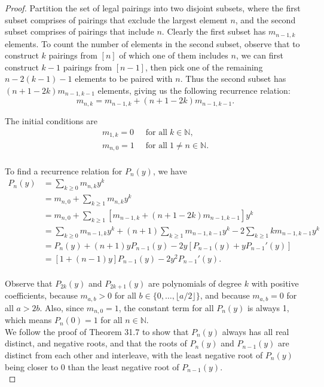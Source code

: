 \documentclass{article}
\begin{document}
\begin{enumerate}[label={\bf Q\arabic*:}]
    \begin{proof}
      Partition the set of legal pairings into two disjoint subsets, where
      the first subset comprises of pairings that exclude the largest
      element $n$, and the second subset comprises of pairings that include
      $n$. Clearly the first subset has $m_{n-1,k}$ elements. To count
      the number of elements in the second subset, observe that to
      construct $k$ pairings from $[n]$ of which one of them includes $n$,
      we can first construct $k-1$ pairings from $[n-1]$, then pick one of
      the remaining $n-2(k-1)-1$ elements to be paired with $n$. Thus the
      second subset has $(n+1-2k)m_{n-1,k-1}$ elements, giving us the
      following recurrence relation:
      \[m_{n,k} =m_{n-1,k} +(n+1-2k)m_{n-1,k-1}.\]

      The initial conditions are
      \begin{align*}
        m_{1,k}=0 &\;\;\text{for all}\; k\in\mathbb{N},\\
        m_{n,0}=1 &\;\;\text{for all}\; 1\neq n\in\mathbb{N}.\\
      \end{align*}

      To find a recurrence relation for $P_n(y)$, we have
      \begin{align*}
        P_n(y) &=\sum_{k\geq0} m_{n,k}y^k\\
        &=m_{n,0} +\sum_{k\geq1} m_{n,k}y^k\\
        &=m_{n,0} +\sum_{k\geq1} \left[m_{n-1,k}
          +(n+1-2k)m_{n-1,k-1}\right] y^k\\
        &=\sum_{k\geq0} m_{n-1,k}y^k +(n+1)\sum_{k\geq1} m_{n-1,k-1} y^k -2
          \sum_{k\geq1} km_{n-1,k-1} y^k\\
        &=P_n(y) +(n+1)yP_{n-1}(y) -2y[P_{n-1}(y)+yP_{n-1}'(y)]\\
        &=[1+(n-1)y] P_{n-1}(y) -2y^2 P_{n-1}'(y).\\
      \end{align*}

      Observe that $P_{2k}(y)$ and $P_{2k+1}(y)$ are polynomials of
      degree $k$ with positive coefficients, because $m_{a,b}>0$ for all
      $b\in\{0,\ldots,\lfloor a/2\rfloor\}$, and because $m_{a,b}=0$ for
      all $a>2b$. Also, since $m_{n,0}=1$, the constant term for all
      $P_n(y)$ is always 1, which means $P_n(0)=1$ for all
      $n\in\mathbb{N}$. \\

      We follow the proof of Theorem 31.7 to show that $P_n(y)$ always has
      all real distinct, and negative roots, and that the roots of $P_n(y)$
      and $P_{n-1}(y)$ are distinct from each other and interleave, with
      the least negative root of $P_n(y)$ being closer to 0 than the least
      negative root of $P_{n-1}(y)$. \\


\end{proof}
\end{enumerate}
\end{document}
